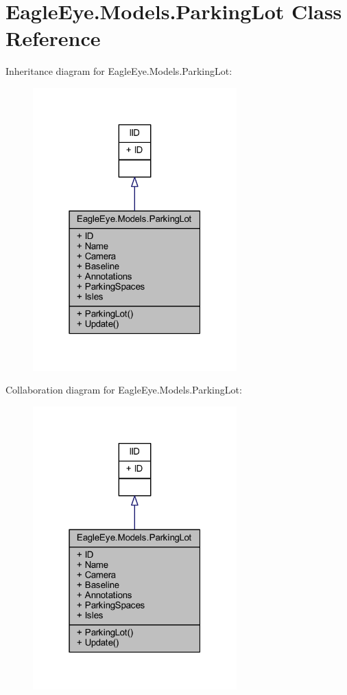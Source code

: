 \hypertarget{class_eagle_eye_1_1_models_1_1_parking_lot}{}\section{Eagle\+Eye.\+Models.\+Parking\+Lot Class Reference}
\label{class_eagle_eye_1_1_models_1_1_parking_lot}


Inheritance diagram for Eagle\+Eye.\+Models.\+Parking\+Lot\+:
\nopagebreak
\begin{figure}[H]
\begin{center}
\leavevmode
\includegraphics[width=223pt]{class_eagle_eye_1_1_models_1_1_parking_lot__inherit__graph}
\end{center}
\end{figure}


Collaboration diagram for Eagle\+Eye.\+Models.\+Parking\+Lot\+:
\nopagebreak
\begin{figure}[H]
\begin{center}
\leavevmode
\includegraphics[width=223pt]{class_eagle_eye_1_1_models_1_1_parking_lot__coll__graph}
\end{center}
\end{figure}
